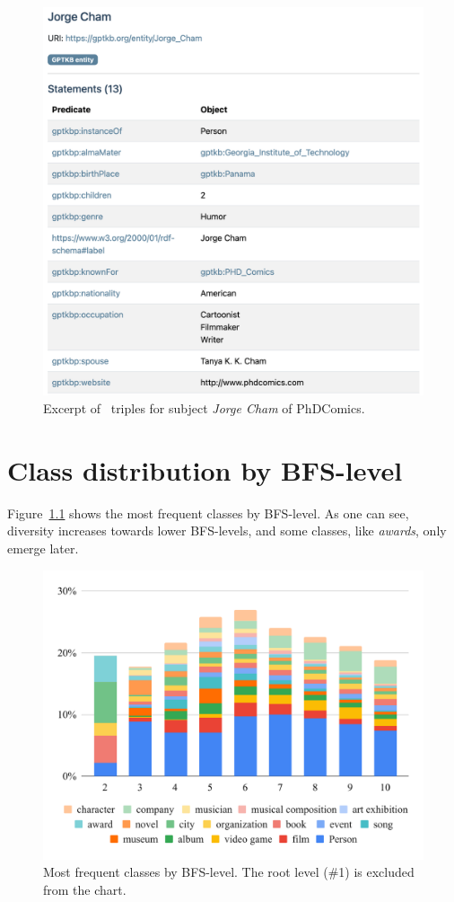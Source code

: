 \begin{figure}[ht]
\includegraphics[width=\columnwidth]{figures/jorgecham.png}
\caption{Excerpt of \ourkb\ triples for subject \textit{Jorge Cham} of PhDComics.}
\label{tab:jorgecham}
\end{figure}


\chapter{Class distribution by BFS-level}
\label{app:layer-classes}

Figure~\ref{fig:classes-by-bfs-level} shows the most frequent classes by BFS-level. As one can see, diversity increases towards lower BFS-levels, and some classes, like \textit{awards}, only emerge later.

\begin{figure}[ht]
 \centering
  \includegraphics[width=1.05\columnwidth]{figures/classdistribution.pdf}
 \caption{Most frequent classes by BFS-level. The root level (\#1) is excluded from the chart.}
 \label{fig:classes-by-bfs-level}
 \end{figure}


